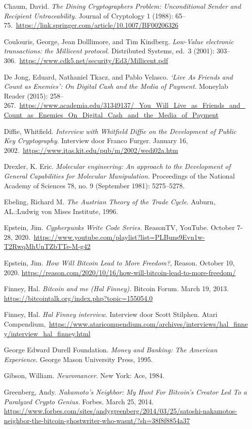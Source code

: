 \documentclass[
  a5paper,
  smalldemyvopaper,11pt,twoside,onecolumn,openright,extrafontsizes,
hidelinks]{memoir}
\begin{document}
{Chaum, David. \emph{The Dining Cryptographers Problem: Unconditional
Sender and Recipient Untraceability.} Journal of Cryptology 1 (1988):
65--75.~\url{https://link.springer.com/article/10.1007/BF00206326}

Coulouris, George, Jean Dolllimore, and Tim Kindberg. \emph{Low-Value
electronic transactions: the Millicent protocol.} Distributed Systems,
ed.~3 (2001):
303--306.~\url{https://www.cdk5.net/security/Ed3/Millicent.pdf}

De Jong, Eduard, Nathaniel Tkacz, and Pablo Velasco. \emph{`Live As
Friends and Count as Enemies': On Digital Cash and the Media of
Payment.} Moneylab Reader (2015):
258--267.~\url{https://www.academia.edu/31349137/_You_Will_Live_as_Friends_and_Count_as_Enemies_On_Digital_Cash_and_the_Media_of_Payment}

Diffie, Whitfield. \emph{Interview with Whitfield Diffie on the
Development of Public Key Cryptography.} Interview door Franco Furger.
January 16, 2002.~\url{https://www.itas.kit.edu/pub/m/2002/wedi02a.htm}

Drexler, K. Eric. \emph{Molecular engineering: An approach to the
Development of General Capabilities for Molecular Manipulation.}
Proceedings of the National Academy of Sciences 78, no. 9 (September
1981): 5275--5278.

Ebeling, Richard M. \emph{The Austrian Theory of the Trade Cycle}.
Auburn, AL.:Ludwig von Mises Institute, 1996.

Epstein, Jim. \emph{Cypherpunks Write Code Series.} ReasonTV, YouTube.
October 7-28,
2020.~\url{https://www.youtube.com/playlist?list=PLBuns9Evn1w-T2RwqMhUnTZbTTe-M-g42}

Epstein, Jim. \emph{How Will Bitcoin Lead to More Freedom?}, Reason.
October 10, 2020.
\url{https://reason.com/2020/10/16/how-will-bitcoin-lead-to-more-freedom/}

Finney, Hal. \emph{Bitcoin and me (Hal Finney).} Bitcoin Forum. March
19, 2013. \url{https://bitcointalk.org/index.php?topic=155054.0}

Finney, Hal. \emph{Hal Finney interview.} Interview door Scott Stilphen.
Atari
Compendium,~\url{https://www.ataricompendium.com/archives/interviews/hal_finney/interview_hal_finney.html}

George Edward Durell Foundation. \emph{Money and Banking: The American
Experience}. George Mason University Press, 1995.

Gibson, William. \emph{Neuromancer}. New York: Ace, 1984.

Greenberg, Andy. \emph{Nakamoto's Neighbor: My Hunt For Bitcoin's
Creator Led To a Paralyzed Crypto Genius.} Forbes. March 25, 2014.
\url{https://www.forbes.com/sites/andygreenberg/2014/03/25/satoshi-nakamotos-neighbor-the-bitcoin-ghostwriter-who-wasnt/?sh=38f8f8854a37}

}
\end{document}
